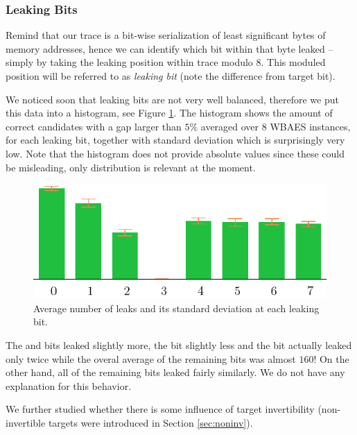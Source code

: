 \subsubsection{Leaking Bits}
	
	Remind that our trace is a bit-wise serialization of least significant bytes of memory addresses, hence we can identify which bit within that byte leaked -- simply by taking the leaking position within trace modulo $8$. This moduled position will be referred to as {\em leaking bit} (note the difference from target bit).
	
	We noticed soon that leaking bits are not very well balanced, therefore we put this data into a histogram, see Figure \ref{fig:leakbitall}. The histogram shows the amount of correct candidates with a gap larger than $5\%$ averaged over $8$ WBAES instances, for each leaking bit, together with standard deviation which is surprisingly very low. Note that the histogram does not provide absolute values since these could be misleading, only distribution is relevant at the moment.
	
	\begin{figure}[h]
	\begin{center}
		\includegraphics{figures/leak_bit/all.pdf}
		\caption{Average number of leaks and its standard deviation at each leaking bit.}
		\label{fig:leakbitall}
	\end{center}
	\end{figure}
	
	The  and  bits leaked slightly more, the  bit slightly less and the  bit actually leaked only twice while the overal average of the remaining bits was almost $160$! On the other hand, all of the remaining bits leaked fairly similarly. We do not have any explanation for this behavior.
	
	We further studied whether there is some influence of target invertibility (non-invertible targets were introduced in Section \ref{sec:noninv}).
	
